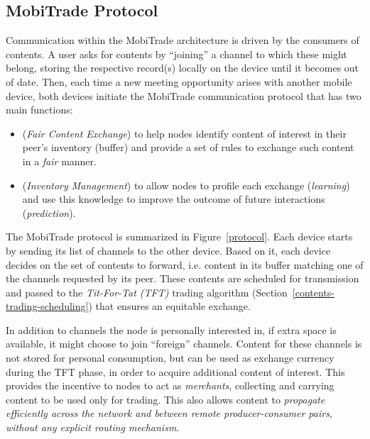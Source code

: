 \subsection{MobiTrade Protocol}
\label{communication-protocol}

Communication within the MobiTrade architecture is driven by the consumers of contents. A user asks for contents by ``joining'' a channel to which these might belong, storing the respective record(s) locally on the device until it becomes out of date. Then, each time a new meeting opportunity arises with another mobile device, both devices initiate the MobiTrade communication protocol that has two main functions:
\begin{itemize}
\item (\emph{Fair Content Exchange}) to help nodes identify content of interest in their peer's inventory (buffer) and provide a set of rules to exchange such content in a \emph{fair} manner.
\item (\emph{Inventory Management}) to allow nodes to profile each exchange (\emph{learning}) and use this knowledge to improve the outcome of future interactions (\emph{prediction}).
\end{itemize}

The MobiTrade protocol is summarized in Figure~\ref{protocol}. Each device starts by sending its list of channels to the other device. Based on it, each device decides on the set of contents to forward, i.e. content in its buffer matching one of the channels requested by its peer. These contents are scheduled for transmission and passed to the \emph{Tit-For-Tat (TFT)} trading algorithm (Section~\ref{contents-trading-scheduling}) that ensures an equitable exchange.

In addition to channels the node is personally interested in, if extra space is available, it might choose to join ``foreign'' channels. Content for these channels is not stored for personal consumption, but can be used as exchange currency during the TFT phase, in order to acquire additional content of interest. This provides the incentive to nodes to act as \emph{merchants}, collecting and carrying content to be used only for trading. This also allows content to \emph{propagate efficiently across the network and between remote producer-consumer pairs, without any explicit routing mechanism}. %

